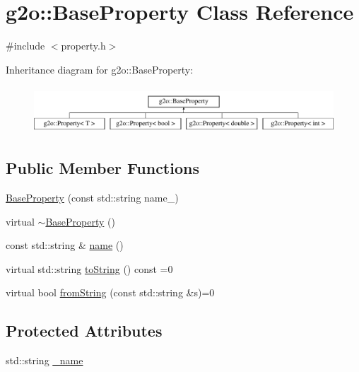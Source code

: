 \hypertarget{classg2o_1_1_base_property}{}\section{g2o\+:\+:Base\+Property Class Reference}
\label{classg2o_1_1_base_property}


{\ttfamily \#include $<$property.\+h$>$}

Inheritance diagram for g2o\+:\+:Base\+Property\+:\begin{figure}[H]
\begin{center}
\leavevmode
\includegraphics[height=1.772152cm]{classg2o_1_1_base_property}
\end{center}
\end{figure}
\subsection*{Public Member Functions}
\begin{DoxyCompactItemize}
\item 
\mbox{\hyperlink{classg2o_1_1_base_property_a00444ab7926d86beb9e66550e40e5d97}{Base\+Property}} (const std\+::string name\+\_\+)
\item 
virtual \mbox{\hyperlink{classg2o_1_1_base_property_acf2a5de9ce5781187fbf6be447918f39}{$\sim$\+Base\+Property}} ()
\item 
const std\+::string \& \mbox{\hyperlink{classg2o_1_1_base_property_aae91313b0eb376dd9460cd712ecbb86d}{name}} ()
\item 
virtual std\+::string \mbox{\hyperlink{classg2o_1_1_base_property_a7a4191088468c2f03dab52107d130833}{to\+String}} () const =0
\item 
virtual bool \mbox{\hyperlink{classg2o_1_1_base_property_aeabc313d9f66a403738aece884c85e1d}{from\+String}} (const std\+::string \&s)=0
\end{DoxyCompactItemize}
\subsection*{Protected Attributes}
\begin{DoxyCompactItemize}
\item 
std\+::string \mbox{\hyperlink{classg2o_1_1_base_property_a74e4bbf35ddf26022cb39be2ea7abd2b}{\+\_\+name}}
\end{DoxyCompactItemize}


